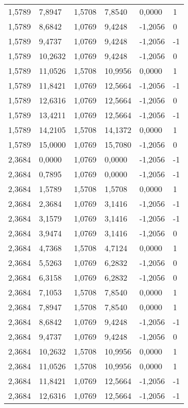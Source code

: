 \begin{longtable}{@{}llllll@{}}
		1,5789  & 7,8947  & 1,5708  & 7,8540  & 0,0000   & 1  \\
		1,5789  & 8,6842  & 1,0769  & 9,4248  & -1,2056  & 0  \\
		1,5789  & 9,4737  & 1,0769  & 9,4248  & -1,2056  & -1 \\
		1,5789  & 10,2632 & 1,0769  & 9,4248  & -1,2056  & 0  \\
		1,5789  & 11,0526 & 1,5708  & 10,9956 & 0,0000   & 1  \\
		1,5789  & 11,8421 & 1,0769  & 12,5664 & -1,2056  & -1 \\
		1,5789  & 12,6316 & 1,0769  & 12,5664 & -1,2056  & 0  \\
		1,5789  & 13,4211 & 1,0769  & 12,5664 & -1,2056  & -1 \\
		1,5789  & 14,2105 & 1,5708  & 14,1372 & 0,0000   & 1  \\
		1,5789  & 15,0000 & 1,0769  & 15,7080 & -1,2056  & 0  \\
		2,3684  & 0,0000  & 1,0769  & 0,0000  & -1,2056  & -1 \\
		2,3684  & 0,7895  & 1,0769  & 0,0000  & -1,2056  & -1 \\
		2,3684  & 1,5789  & 1,5708  & 1,5708  & 0,0000   & 1  \\
		2,3684  & 2,3684  & 1,0769  & 3,1416  & -1,2056  & -1 \\
		2,3684  & 3,1579  & 1,0769  & 3,1416  & -1,2056  & -1 \\
		2,3684  & 3,9474  & 1,0769  & 3,1416  & -1,2056  & 0  \\
		2,3684  & 4,7368  & 1,5708  & 4,7124  & 0,0000   & 1  \\
		2,3684  & 5,5263  & 1,0769  & 6,2832  & -1,2056  & 0  \\
		2,3684  & 6,3158  & 1,0769  & 6,2832  & -1,2056  & 0  \\
		2,3684  & 7,1053  & 1,5708  & 7,8540  & 0,0000   & 1  \\
		2,3684  & 7,8947  & 1,5708  & 7,8540  & 0,0000   & 1  \\
		2,3684  & 8,6842  & 1,0769  & 9,4248  & -1,2056  & -1 \\
		2,3684  & 9,4737  & 1,0769  & 9,4248  & -1,2056  & 0  \\
		2,3684  & 10,2632 & 1,5708  & 10,9956 & 0,0000   & 1  \\
		2,3684  & 11,0526 & 1,5708  & 10,9956 & 0,0000   & 1  \\
		2,3684  & 11,8421 & 1,0769  & 12,5664 & -1,2056  & -1 \\
		2,3684  & 12,6316 & 1,0769  & 12,5664 & -1,2056  & -1 \\

\end{longtable}
